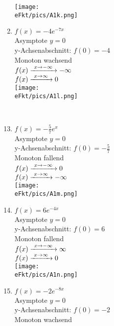 \begin{Answer}[ref=eFktA1]
\begin{minipage}{\textwidth}
\begin{minipage}[t]{0.49\textwidth}
\begin{enumerate}[label=\alph*)]
				\texttt{[image: \\eFkt/pics/A1k.png]}
				\item \(f(x)=-4e^{-7x}\)\\
				Asymptote \(y=0\)\\
				y-Achsenabschnitt: \(f(0)=-4\)\\
				Monoton wachsend\\
				\(f(x)\xrightarrow{\hphantom{\ }x\to-\infty\hphantom{\ }}-\infty\)\\
				\(f(x)\xrightarrow{\hphantom{\ }x\to\infty\hphantom{\ }}0\)\\
				\texttt{[image: \\eFkt/pics/A1l.png]}
			\end{enumerate}
		\end{minipage}
	\end{minipage}\\
	\begin{minipage}{\textwidth}
		\begin{minipage}[t]{0.49\textwidth}
			\begin{enumerate}[label=\alph*)]
				\setcounter{enumi}{12}
				\item \(f(x)=-\frac{5}{7}e^{x}\)\\
				Asymptote \(y=0\)\\
				y-Achsenabschnitt: \(f(0)=-\frac{5}{7}\)\\
				Monoton fallend\\
				\(f(x)\xrightarrow{\hphantom{\ }x\to-\infty\hphantom{\ }}0\)\\
				\(f(x)\xrightarrow{\hphantom{\ }x\to\infty\hphantom{\ }}-\infty\)\\
				\texttt{[image: \\eFkt/pics/A1m.png]}
				\item \(f(x)=6e^{-4x}\)\\
				Asymptote \(y=0\)\\
				y-Achsenabschnitt: \(f(0)=6\)\\
				Monoton fallend\\
				\(f(x)\xrightarrow{\hphantom{\ }x\to-\infty\hphantom{\ }}\infty\)\\
				\(f(x)\xrightarrow{\hphantom{\ }x\to\infty\hphantom{\ }}0\)\\
				\texttt{[image: \\eFkt/pics/A1n.png]}
				\item \(f(x)=-2e^{-8x}\)\\
				Asymptote \(y=0\)\\
				y-Achsenabschnitt: \(f(0)=-2\)\\
				Monoton wachsend\\

\end{enumerate}
\end{minipage}
\end{minipage}
\end{Answer}

